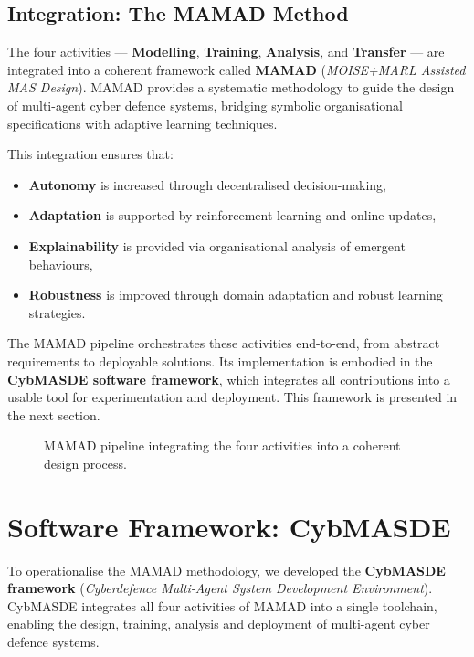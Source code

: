 \documentclass[a4paper,10pt,twocolumn]{article}
\begin{document}
\subsection*{Integration: The MAMAD Method}

The four activities --- \textbf{Modelling}, \textbf{Training},
\textbf{Analysis}, and \textbf{Transfer} --- are integrated into a
coherent framework called \textbf{MAMAD}
(\textit{MOISE+MARL Assisted MAS Design}). MAMAD provides a systematic
methodology to guide the design of multi-agent cyber defence systems,
bridging symbolic organisational specifications with adaptive learning
techniques.

This integration ensures that:
\begin{itemize}
    \item \textbf{Autonomy} is increased through decentralised decision-making,
    \item \textbf{Adaptation} is supported by reinforcement learning and
          online updates,
    \item \textbf{Explainability} is provided via organisational analysis of
          emergent behaviours,
    \item \textbf{Robustness} is improved through domain adaptation and
          robust learning strategies.
\end{itemize}

The MAMAD pipeline orchestrates these activities end-to-end, from
abstract requirements to deployable solutions. Its implementation is
embodied in the \textbf{CybMASDE software framework}, which integrates
all contributions into a usable tool for experimentation and
deployment. This framework is presented in the next section.

\begin{figure}[h!]
    \centering
    
    \caption{MAMAD pipeline integrating the four activities into a coherent design process.}
    \label{fig:cycle}
\end{figure}

\section{Software Framework: CybMASDE}

To operationalise the MAMAD methodology, we developed the
\textbf{CybMASDE framework} (\textit{Cyberdefence Multi-Agent System
    Development Environment}). CybMASDE integrates all four activities of
MAMAD into a single toolchain, enabling the design, training, analysis
and deployment of multi-agent cyber defence systems.
\end{document}

